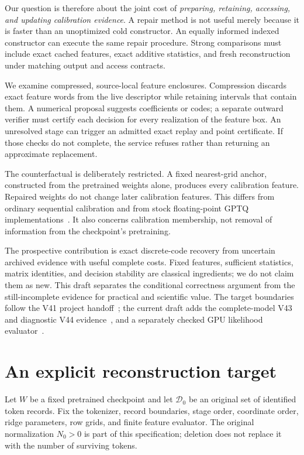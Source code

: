\documentclass[10pt,twocolumn,letterpaper]{article}
\newcommand{\calD}{\mathcal{D}}
\begin{document}
Our question is therefore about the joint cost of \emph{preparing, retaining,
accessing, and updating calibration evidence}. A repair method is not useful
merely because it is faster than an unoptimized cold constructor. An equally
informed indexed constructor can execute the same repair procedure. Strong
comparisons must include exact cached features, exact additive statistics, and
fresh reconstruction under matching output and access contracts.

We examine compressed, source-local feature enclosures. Compression discards
exact feature words from the live descriptor while retaining intervals that
contain them. A numerical proposal suggests coefficients or codes; a separate
outward verifier must certify each decision for every realization of the feature
box. An unresolved stage can trigger an admitted exact replay and point
certificate. If those checks do not complete, the service refuses rather than
returning an approximate replacement.

The counterfactual is deliberately restricted. A fixed nearest-grid anchor,
constructed from the pretrained weights alone, produces every calibration
feature. Repaired weights do not change later calibration features. This differs
from ordinary sequential calibration and from stock floating-point GPTQ
implementations~\cite{gptq}. It also concerns calibration membership, not removal
of information from the checkpoint's pretraining.

The prospective contribution is exact discrete-code recovery from uncertain
archived evidence with useful complete costs. Fixed features, sufficient
statistics, matrix identities, and decision stability are classical ingredients;
we do not claim them as new. This draft separates the conditional correctness
argument from the still-incomplete evidence for practical and scientific value.
The target boundaries follow the V41 project handoff~\cite{boundaries};
the current draft adds the complete-model V43 and diagnostic V44 evidence~\cite{v43,v44},
and a separately checked GPU likelihood evaluator~\cite{v47}.

\section{An explicit reconstruction target}
\label{sec:target}
Let $W$ be a fixed pretrained checkpoint and let $\calD_0$ be an original set of
identified token records. Fix the tokenizer, record boundaries, stage order,
coordinate order, ridge parameters, row grids, and finite feature evaluator.
The original normalization $N_0>0$ is part of this specification; deletion does
not replace it with the number of surviving tokens.
\end{document}
